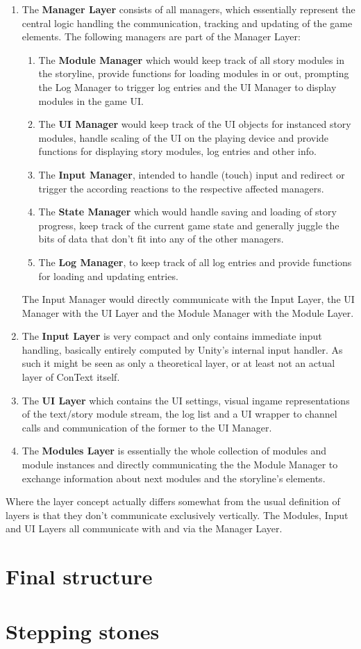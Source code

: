 \begin{enumerate}
\item The \textbf{Manager Layer} consists of all managers, which essentially represent the central logic handling the communication, tracking and updating of the game elements. The following managers are part of the Manager Layer:
	\begin{enumerate}
	\item The \textbf{Module Manager} which would keep track of all story modules in the storyline, provide functions for loading modules in or out, prompting the Log Manager to trigger log entries and the UI Manager to display modules in the game UI.
	\item The \textbf{UI Manager} would keep track of the UI objects for instanced story modules, handle scaling of the UI on the playing device and provide functions for displaying story modules, log entries and other info.
	\item The \textbf{Input Manager}, intended to handle (touch) input and redirect or trigger the according reactions to the respective affected managers.
	\item The \textbf{State Manager} which would handle saving and loading of story progress, keep track of the current game state and generally juggle the bits of data that don't fit into any of the other managers.
	\item The \textbf{Log Manager}, to keep track of all log entries and provide functions for loading and updating entries.
	\end{enumerate}
	The Input Manager would directly communicate with the Input Layer, the UI Manager with the UI Layer and the Module Manager with the Module Layer.
\item The \textbf{Input Layer} is very compact and only contains immediate input handling,  basically entirely computed by Unity's internal input handler. As such it might be seen as only a theoretical layer, or at least not an actual layer of ConText itself.
\item The \textbf{UI Layer} which contains the UI settings, visual ingame representations of the text/story module stream, the log list and a UI wrapper to channel calls and communication of the former to the UI Manager.
\item The \textbf{Modules Layer} is essentially the whole collection of modules and module instances and directly communicating the the Module Manager to exchange information about next modules and the storyline's elements.
\end{enumerate}
Where the layer concept actually differs somewhat from the usual definition of layers is that they don't communicate exclusively vertically. The Modules, Input and UI Layers all communicate with and via the Manager Layer.

\section{Final structure}


\section{Stepping stones}
